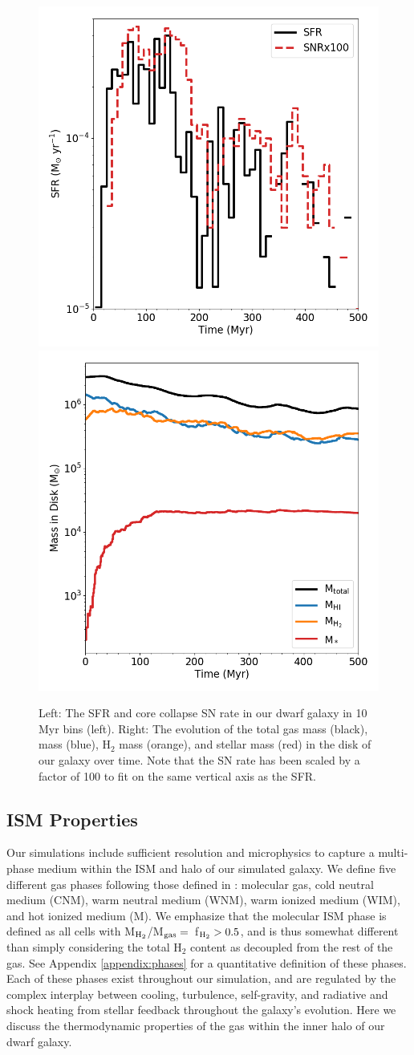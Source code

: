 \documentclass[twocolumn]{aastex61}
\begin{document}
\begin{figure}
\centering
\includegraphics[width=0.475\linewidth]{sfr_snrx100}
\includegraphics[width=0.475\linewidth]{mass_evolution}
\caption{Left: The SFR and core collapse SN rate in our dwarf galaxy in 10 Myr bins (left). Right: The evolution of the total gas mass (black),  mass (blue), H$_2$ mass (orange), and stellar mass (red) in the disk of our galaxy over time. Note that the SN rate has been scaled by a factor of 100 to fit on the same vertical axis as the SFR.}
\label{fig:sfr_mass_evolution}
\end{figure}

\subsection{ISM Properties}
\label{sec:phase}

Our simulations include sufficient resolution and microphysics to capture a multi-phase medium within the ISM and halo of our simulated galaxy. We define five different gas phases following those defined in \citep{Draine2011}: molecular gas, cold neutral medium (CNM), warm neutral medium (WNM), warm ionized medium (WIM), and hot ionized medium (M). We emphasize that the molecular ISM phase is defined as all cells with M$_{\rm H_2}$/M$_{\rm gas} = $~f$_{\rm H_2} > 0.5$, and is thus somewhat different than simply considering the total H$_2$ content as decoupled from the rest of the gas. See Appendix \ref{appendix:phases} for a quantitative definition of these phases. Each of these phases exist throughout our simulation, and are regulated by the complex interplay between cooling, turbulence, self-gravity, and radiative and shock heating from stellar feedback throughout the galaxy's evolution. Here we discuss the thermodynamic properties of the gas within the inner halo of our dwarf galaxy.
\end{document}
